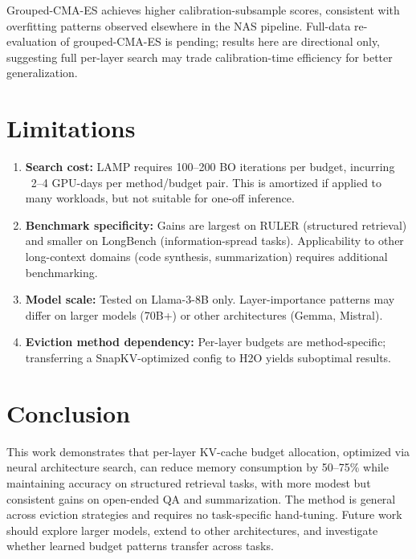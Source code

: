 \documentclass[11pt]{article}
\begin{document}
Grouped-CMA-ES achieves higher calibration-subsample scores, consistent with overfitting patterns observed elsewhere in the NAS pipeline. Full-data re-evaluation of grouped-CMA-ES is pending; results here are directional only, suggesting full per-layer search may trade calibration-time efficiency for better generalization.

\section{Limitations}

\begin{enumerate}
\item \textbf{Search cost:} LAMP requires 100–200 BO iterations per budget, incurring ~2–4 GPU-days per method/budget pair. This is amortized if applied to many workloads, but not suitable for one-off inference.
\item \textbf{Benchmark specificity:} Gains are largest on RULER (structured retrieval) and smaller on LongBench (information-spread tasks). Applicability to other long-context domains (code synthesis, summarization) requires additional benchmarking.
\item \textbf{Model scale:} Tested on Llama-3-8B only. Layer-importance patterns may differ on larger models (70B+) or other architectures (Gemma, Mistral).
\item \textbf{Eviction method dependency:} Per-layer budgets are method-specific; transferring a SnapKV-optimized config to H2O yields suboptimal results.
\end{enumerate}

\section{Conclusion}

This work demonstrates that per-layer KV-cache budget allocation, optimized via neural architecture search, can reduce memory consumption by 50–75\% while maintaining accuracy on structured retrieval tasks, with more modest but consistent gains on open-ended QA and summarization. The method is general across eviction strategies and requires no task-specific hand-tuning. Future work should explore larger models, extend to other architectures, and investigate whether learned budget patterns transfer across tasks.


\end{document}
